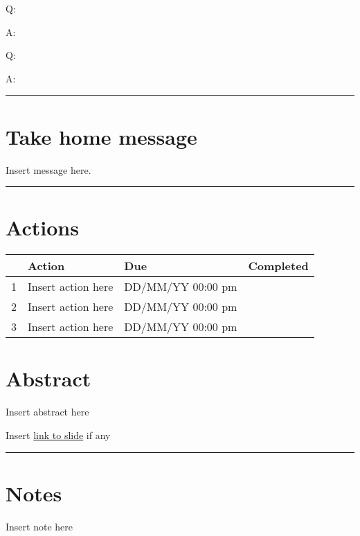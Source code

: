 \documentclass[
]{book}
\begin{document}
Q:

A:

Q:

A:

\begin{center}\rule{0.5\linewidth}{0.5pt}\end{center}

\hypertarget{take-home-message}{%
\section*{Take home message}\label{take-home-message}}

Insert message here.

\begin{center}\rule{0.5\linewidth}{0.5pt}\end{center}

\hypertarget{actions}{%
\section*{Actions}\label{actions}}

\begin{longtable}[]{@{}llll@{}}
\toprule
& Action & Due & Completed\tabularnewline
\midrule
\endhead
1 & Insert action here & DD/MM/YY 00:00 pm &\tabularnewline
2 & Insert action here & DD/MM/YY 00:00 pm &\tabularnewline
3 & Insert action here & DD/MM/YY 00:00 pm &\tabularnewline
\bottomrule
\end{longtable}

\hypertarget{abstract-1}{%
\section*{Abstract}\label{abstract-1}}

Insert abstract here

Insert \href{}{link to slide} if any

\begin{center}\rule{0.5\linewidth}{0.5pt}\end{center}

\hypertarget{notes-1}{%
\section*{Notes}\label{notes-1}}

Insert note here
\end{document}

